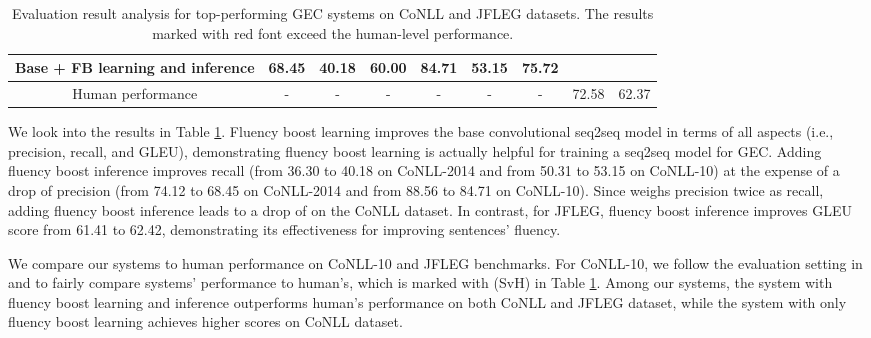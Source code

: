 \documentclass{article} \usepackage{MSRA_TR,times}
\begin{document}
\begin{table}[t]
{\begin{tabular}{c|ccc|ccc|c|c}
\multicolumn{1}{l|}{Base + FB learning and inference} & 68.45          & 40.18 & 60.00          & 84.71          & \textbf{53.15} & 75.72          & \color{red}{74.84}          & \color{red}{\textbf{62.42}} \\ \hline
Human performance                                    & -              & -              & -              & -              & -              & -              & 72.58          & 62.37         \\ \hline 
\end{tabular}
}
\caption{Evaluation result analysis for top-performing GEC systems on CoNLL and JFLEG datasets. The results marked with red font exceed the human-level performance.}
\label{tab:result_analysis}
\end{table}

We look into the results in Table \ref{tab:result_analysis}. Fluency boost learning improves the base convolutional seq2seq model in terms of all aspects (i.e., precision, recall,  and GLEU), demonstrating fluency boost learning is actually helpful for training a seq2seq model for GEC. Adding fluency boost inference improves recall (from 36.30 to 40.18 on CoNLL-2014 and from 50.31 to 53.15 on CoNLL-10) at the expense of a drop of precision (from 74.12 to 68.45 on CoNLL-2014 and from 88.56 to 84.71 on CoNLL-10). Since  weighs precision twice as recall, adding fluency boost inference leads to a drop of  on the CoNLL dataset. In contrast, for JFLEG, fluency boost inference improves GLEU score from 61.41 to 62.42, demonstrating its effectiveness for improving sentences' fluency.

We compare our systems to human performance on CoNLL-10 and JFLEG benchmarks. For CoNLL-10, we follow the evaluation setting in \cite{bryant2015far} and \cite{chollampatt-ng:2017:BEA} to fairly compare systems' performance to human's, which is marked with (SvH) in Table \ref{tab:result_analysis}. Among our systems, the system with fluency boost learning and inference outperforms human's performance on both CoNLL and JFLEG dataset, while the system with only fluency boost learning achieves higher  scores on CoNLL dataset.
\end{document}

